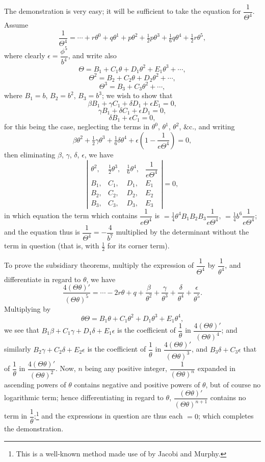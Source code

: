 \documentclass[11pt]{article}
\begin{document}
The demonstration is very easy; it will be sufficient to take the equation for $\dfrac{1}{\Theta^{4}}$. Assume
\[
\frac{1}{\Theta^{4}} = \cdots + r\theta^{0} + q\theta^{1} + p\theta^{2} + \tfrac{1}{2}p\theta^{3} + \tfrac{1}{6}q\theta^{4} + \tfrac{1}{2}r\theta^{5},
\]
where clearly $\epsilon = \dfrac{\phi^{5}}{b^{4}}$, and write also
\[
\Theta = B_{1} + C_{1}\theta + D_{1}\theta^{2} + E_{1}\theta^{3} + \cdots,
\]
\[
\Theta^{2} = B_{2} + C_{2}\theta + D_{2}\theta^{2} + \cdots,
\]
\[
\Theta^{3} = B_{3} + C_{3}\theta^{2} + \cdots,
\]
where $B_{1}=b$, $B_{2}=b^{2}$, $B_{3}=b^{3}$; we wish to show that
\[
\beta B_{1} + \gamma C_{1} + \delta D_{1} + \epsilon E_{1} = 0,
\]
\[
\gamma B_{1} + \delta C_{1} + \epsilon D_{1} = 0,
\]
\[
\delta B_{1} + \epsilon C_{1} = 0,
\]
for this being the case, neglecting the terms in $\theta^{0}$, $\theta^{1}$, $\theta^{2}$, \&c., and writing
\[
\beta\theta^{2} + \tfrac{1}{2}\gamma\theta^{3} + \tfrac{1}{6}\delta\theta^{4} + \epsilon\!\left(1 - \frac{1}{e\Theta^{4}}\right) = 0,
\]
then eliminating $\beta$, $\gamma$, $\delta$, $\epsilon$, we have
\[
\left|\begin{array}{cccc}\theta^{2},&\tfrac{1}{2}\theta^{3},&\tfrac{1}{6}\theta^{4},&\dfrac{1}{e\Theta^{4}}\\ B_{1},&C_{1},&D_{1},&E_{1}\\ B_{2},&C_{2},&D_{2},&E_{2}\\ B_{3},&C_{3},&D_{3},&E_{3}\end{array}\right| = 0,
\]
in which equation the term which contains $\dfrac{1}{e\Theta^{4}}$ is $= \tfrac{1}{4}\theta^{4}B_{1}B_{2}B_{3}\dfrac{1}{e\Theta^{4}}$, $= \tfrac{1}{4}b^{6}\dfrac{1}{e\Theta^{4}}$;
and the equation thus is $\dfrac{1}{\Theta^{4}} = -\dfrac{4}{b^{7}}$ multiplied by the determinant without the term in question (that is, with $\tfrac{1}{2}$ for its corner term).

To prove the subsidiary theorems, multiply the expression of $\dfrac{1}{\Theta^{4}}$ by $\dfrac{1}{\theta^{4}}$, and differentiate in regard to $\theta$, we have
\[
\frac{4(\Theta\theta)'}{(\Theta\theta)^{5}} = \cdots -2r\theta + q + \frac{\beta}{\theta^{2}} + \frac{\gamma}{\theta^{3}} + \frac{\delta}{\theta^{4}} + \frac{\epsilon}{\theta^{5}}.
\]
Multiplying by
\[
\theta\Theta = B_{1}\theta + C_{1}\theta^{2} + D_{1}\theta^{3} + E_{1}\theta^{4},
\]
we see that $B_{1}\beta + C_{1}\gamma + D_{1}\delta + E_{1}\epsilon$ is the coefficient of $\dfrac{1}{\theta}$ in $\dfrac{4(\Theta\theta)'}{(\Theta\theta)^{4}}$; and similarly $B_{2}\gamma + C_{2}\delta + E_{2}\epsilon$ is the coefficient of $\dfrac{1}{\theta}$ in $\dfrac{4(\Theta\theta)'}{(\Theta\theta)^{3}}$, and $B_{3}\delta + C_{3}\epsilon$ that of $\dfrac{1}{\theta}$ in $\dfrac{4(\Theta\theta)'}{(\Theta\theta)^{2}}$. Now, $n$ being any positive integer, $\dfrac{1}{(\Theta\theta)^{n}}$ expanded in ascending powers of $\theta$ contains negative and positive powers of $\theta$, but of course no logarithmic term; hence differentiating in regard to $\theta$, $\dfrac{(\Theta\theta)'}{(\Theta\theta)^{n+1}}$ contains no term in $\dfrac{1}{\theta}$;\footnote{This is a well-known method made use of by Jacobi and Murphy.} and the expressions in question are thus each $=0$; which completes the demonstration.
\end{document}
